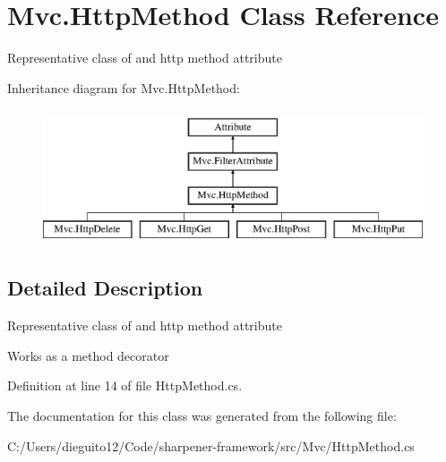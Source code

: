 \hypertarget{class_mvc_1_1_http_method}{}\section{Mvc.\+Http\+Method Class Reference}
\label{class_mvc_1_1_http_method}


Representative class of and http method attribute  


Inheritance diagram for Mvc.\+Http\+Method\+:\begin{figure}[H]
\begin{center}
\leavevmode
\includegraphics[height=4.000000cm]{class_mvc_1_1_http_method}
\end{center}
\end{figure}


\subsection{Detailed Description}
Representative class of and http method attribute 

Works as a method decorator

Definition at line 14 of file Http\+Method.\+cs.



The documentation for this class was generated from the following file\+:\begin{DoxyCompactItemize}
\item 
C\+:/\+Users/dieguito12/\+Code/sharpener-\/framework/src/\+Mvc/Http\+Method.\+cs\end{DoxyCompactItemize}
